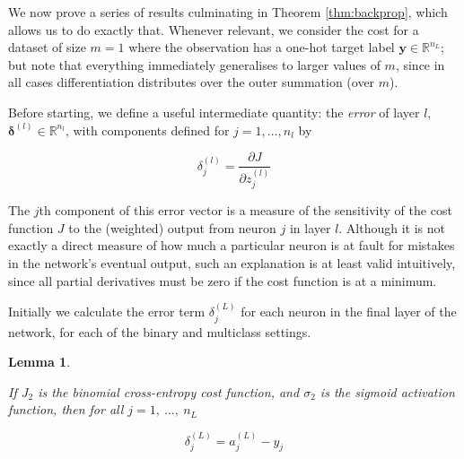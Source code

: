 \documentclass{article}[11pt]
\newtheorem{lemma}{Lemma}
\begin{document}
        We now prove a series of results culminating in Theorem \ref{thm:backprop}, which allows us to do exactly that. Whenever relevant, we consider the cost for a dataset of size $m = 1$ where the observation has a one-hot target label $\mathbf{y} \in \mathbb{R}^{n_L}$; but note that everything immediately generalises to larger values of $m$, since in all cases differentiation distributes over the outer summation (over $m$).
        
        Before starting, we define a useful intermediate quantity: the \textit{error} of layer $l$, $\boldsymbol{\delta}^{(l)} \in \mathbb{R}^{n_l}$, with components defined for $j = 1, \ldots, n_l$ by
        
        $$
        \delta^{(l)}_j = \frac{\partial J}{\partial z^{(l)}_j}
        $$
        
        The $j$th component of this error vector is a measure of the sensitivity of the cost function $J$ to the (weighted) output from neuron $j$ in layer $l$. Although it is not exactly a direct measure of how much a particular neuron is at fault for mistakes in the network's eventual output, such an explanation is at least valid intuitively, since all partial derivatives must be zero if the cost function is at a minimum.
        
        Initially we calculate the error term $\delta^{(L)}_j$ for each neuron in the final layer of the network, for each of the binary and multiclass settings.
        
        
        \begin{lemma} \label{thm:init_sigmoid}
            
            If $J_2$ is the binomial cross-entropy cost function, and $\sigma_2$ is the sigmoid activation function, then for all $j = 1, \ \ldots, \ n_L$
            
            $$
            \delta^{(L)}_j = a^{(L)}_j - y_j
            $$
            
        \end{lemma}
        
\end{document}
